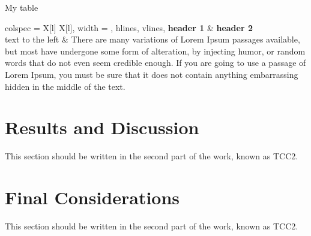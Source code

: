          \begin{table}[ht]
            \centering
            \caption{My table}
            \label{tab:id_tabela}
            \begin{tblr}{
              colspec = {X[l] X[l]}, %
              width = \linewidth,
              hlines, %
              vlines, %
            }
            \textbf{header 1} & \textbf{header 2} \\
            {text to the left} & {There are many variations of Lorem Ipsum passages available, but most have undergone some form of alteration, by injecting humor, or random words that do not even seem credible enough. If you are going to use a passage of Lorem Ipsum, you must be sure that it does not contain anything embarrassing hidden in the middle of the text.}
            \end{tblr}
        \end{table}
    
    \section{Results and Discussion}
    This section should be written in the second part of the work, known as TCC2.
    
    \section{Final Considerations}
    This section should be written in the second part of the work, known as TCC2.
    
    \printbibliography  %

